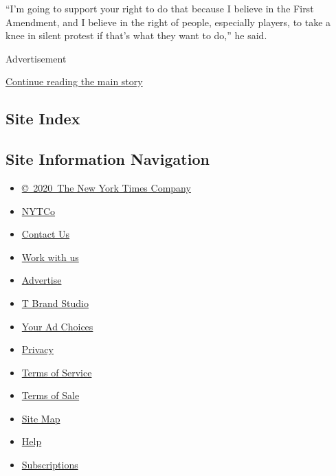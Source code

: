 ``I'm going to support your right to do that because I believe in the
First Amendment, and I believe in the right of people, especially
players, to take a knee in silent protest if that's what they want to
do,'' he said.

Advertisement

\protect\hyperlink{after-bottom}{Continue reading the main story}

\hypertarget{site-index}{%
\subsection{Site Index}\label{site-index}}

\hypertarget{site-information-navigation}{%
\subsection{Site Information
Navigation}\label{site-information-navigation}}

\begin{itemize}
\tightlist
\item
  \href{https://help.nytimes3xbfgragh.onion/hc/en-us/articles/115014792127-Copyright-notice}{©~2020~The
  New York Times Company}
\end{itemize}

\begin{itemize}
\tightlist
\item
  \href{https://www.nytco.com/}{NYTCo}
\item
  \href{https://help.nytimes3xbfgragh.onion/hc/en-us/articles/115015385887-Contact-Us}{Contact
  Us}
\item
  \href{https://www.nytco.com/careers/}{Work with us}
\item
  \href{https://nytmediakit.com/}{Advertise}
\item
  \href{http://www.tbrandstudio.com/}{T Brand Studio}
\item
  \href{https://www.nytimes3xbfgragh.onion/privacy/cookie-policy\#how-do-i-manage-trackers}{Your
  Ad Choices}
\item
  \href{https://www.nytimes3xbfgragh.onion/privacy}{Privacy}
\item
  \href{https://help.nytimes3xbfgragh.onion/hc/en-us/articles/115014893428-Terms-of-service}{Terms
  of Service}
\item
  \href{https://help.nytimes3xbfgragh.onion/hc/en-us/articles/115014893968-Terms-of-sale}{Terms
  of Sale}
\item
  \href{https://spiderbites.nytimes3xbfgragh.onion}{Site Map}
\item
  \href{https://help.nytimes3xbfgragh.onion/hc/en-us}{Help}
\item
  \href{https://www.nytimes3xbfgragh.onion/subscription?campaignId=37WXW}{Subscriptions}
\end{itemize}
